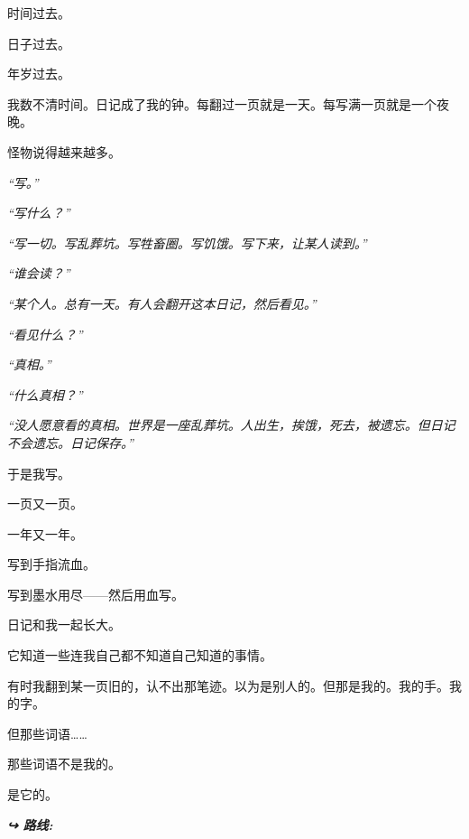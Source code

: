 \noindent 时间过去。

\noindent 日子过去。

\noindent 年岁过去。

\noindent 我数不清时间。日记成了我的钟。每翻过一页就是一天。每写满一页就是一个夜晚。

\noindent 怪物说得越来越多。

\noindent \textit{“写。”}

\noindent \textit{“写什么？”}

\noindent \textit{“写一切。写乱葬坑。写牲畜圈。写饥饿。写下来，让某人读到。”}

\noindent \textit{“谁会读？”}

\noindent \textit{“某个人。总有一天。有人会翻开这本日记，然后看见。”}

\noindent \textit{“看见什么？”}

\noindent \textit{“真相。”}

\noindent \textit{“什么真相？”}

\noindent \textit{“没人愿意看的真相。世界是一座乱葬坑。人出生，挨饿，死去，被遗忘。但日记不会遗忘。日记保存。”}

\noindent 于是我写。

\noindent 一页又一页。

\noindent 一年又一年。

\noindent 写到手指流血。

\noindent 写到墨水用尽——然后用血写。

\noindent 日记和我一起长大。

\noindent 它知道一些连我自己都不知道自己知道的事情。

\noindent 有时我翻到某一页旧的，认不出那笔迹。以为是别人的。但那是我的。我的手。我的字。

\noindent 但那些词语……

\noindent 那些词语不是我的。

\noindent 是它的。

\vspace{0.5em}
\noindent\textit{\textbf{↪ 路线:}  \rotasep {}}
